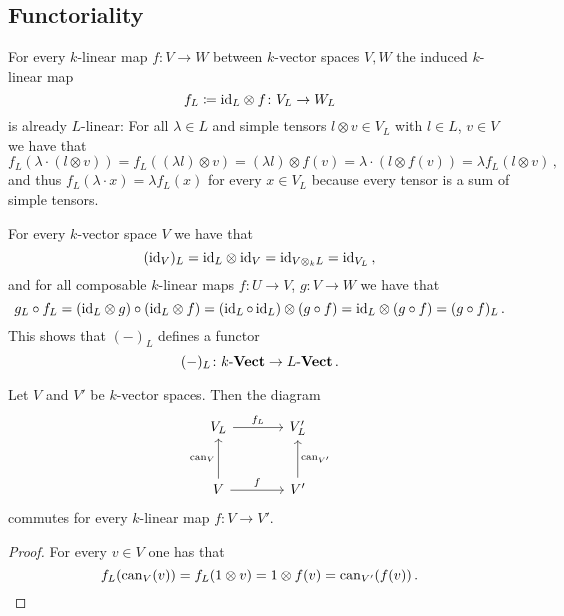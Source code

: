 \subsection{Functoriality}

\begin{fluff}
  For every $k$-linear map $f \colon V \to W$ between $k$-vector spaces $V, W$ the induced $k$-linear map
  \[
              f_L
    \coloneqq {\operatorname{id}_L} \otimes f
    \colon    V_L
    \to       W_L
  \]
  is already $L$-linear:
  For all $\lambda \in L$ and simple tensors $l \otimes v \in V_L$ with $l \in L$, $v \in V$ we have that
  \[
      f_L( \lambda \cdot (l \otimes v) )
    = f_L( (\lambda l) \otimes v )
    = (\lambda l) \otimes f(v)
    = \lambda \cdot (l \otimes f(v))
    = \lambda f_L(l \otimes v) \,,
  \]
  and thus $f_L( \lambda \cdot x ) = \lambda f_L(x)$ for every $x \in V_L$ because every tensor is a sum of simple tensors.
  
  For every $k$-vector space $V$ we have that
  \[
      (\operatorname{id}_V)_L
    = {\operatorname{id}_L} \otimes {\operatorname{id}_V}
    = \operatorname{id}_{V \otimes_k L}
    = \operatorname{id}_{V_L} \,,
  \]
  and for all composable $k$-linear maps $f \colon U \to V$, $g \colon V \to W$ we have that
  \[
      g_L \circ f_L
    = ({\operatorname{id}_L} \otimes g) \circ ({\operatorname{id}_L} \otimes f)
    = (\operatorname{id}_L \circ \operatorname{id}_L) \otimes (g \circ f)
    = {\operatorname{id}_L} \otimes (g \circ f)
    = (g \circ f)_L \,.
  \]
  This shows that $(-)_L$ defines a functor
  \[
            (-)_L
    \colon  k\text{-}\mathbf{Vect}
    \to     L\text{-}\mathbf{Vect} \,.
  \]
\end{fluff}

\begin{lemma}
  \label{lemma: abstract description of fL}
  Let $V$ and $V'$ be $k$-vector spaces.
  Then the diagram
  \[
    \begin{tikzcd}[sep = large]
        V_L
        \arrow{r}[above]{f_L}
      & V'_L
      \\
        V
        \arrow{r}[above]{f}
        \arrow{u}[left]{\can_V}
      & V'
        \arrow{u}[right]{\can_{V'}}
    \end{tikzcd}
  \]
  commutes for every $k$-linear map $f \colon V \to V'$.
\end{lemma}
\begin{proof}
  For every $v \in V$ one has that
  \[
          f_L(\operatorname{can}_V(v))
      =  f_L(1 \otimes v)
      =  1 \otimes f(v)
      =  \operatorname{can}_{V'}(f(v)) \,.
    \qedhere
  \]
\end{proof}


